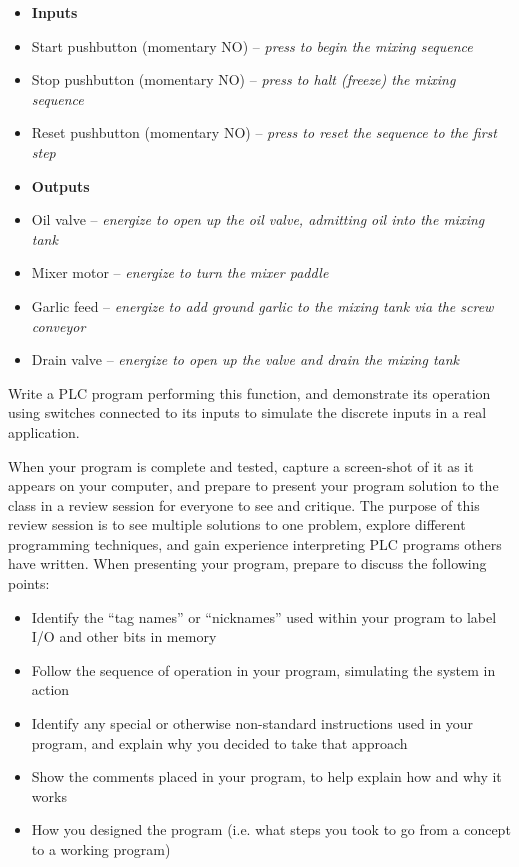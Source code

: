 \documentclass[12pt,a4paper]{article}
\begin{document}
\begin{itemize}
\item{} {\bf Inputs} 
\item{} Start pushbutton (momentary NO) -- {\it press to begin the mixing sequence}
\item{} Stop pushbutton (momentary NO) -- {\it press to halt (freeze) the mixing sequence}
\item{} Reset pushbutton (momentary NO) -- {\it press to reset the sequence to the first step}
\end{itemize}

\begin{itemize}
\item{} {\bf Outputs} 
\item{} Oil valve -- {\it energize to open up the oil valve, admitting oil into the mixing tank}
\item{} Mixer motor -- {\it energize to turn the mixer paddle}
\item{} Garlic feed -- {\it energize to add ground garlic to the mixing tank via the screw conveyor}
\item{} Drain valve -- {\it energize to open up the valve and drain the mixing tank}
\end{itemize}

\filbreak

Write a PLC program performing this function, and demonstrate its operation using switches connected to its inputs to simulate the discrete inputs in a real application.  

\vskip 10pt

When your program is complete and tested, capture a screen-shot of it as it appears on your computer, and prepare to present your program solution to the class in a review session for everyone to see and critique.  The purpose of this review session is to see multiple solutions to one problem, explore different programming techniques, and gain experience interpreting PLC programs others have written.  When presenting your program, prepare to discuss the following points:

\begin{itemize}
\item{} Identify the ``tag names'' or ``nicknames'' used within your program to label I/O and other bits in memory
\item{} Follow the sequence of operation in your program, simulating the system in action
\item{} Identify any special or otherwise non-standard instructions used in your program, and explain why you decided to take that approach
\item{} Show the comments placed in your program, to help explain how and why it works
\item{} How you designed the program (i.e. what steps you took to go from a concept to a working program)
\end{itemize}
\end{document}
